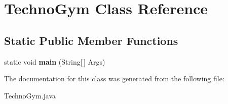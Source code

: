 \hypertarget{class_techno_gym}{}\section{Techno\+Gym Class Reference}
\label{class_techno_gym}
\subsection*{Static Public Member Functions}
\begin{DoxyCompactItemize}
\item 
\hypertarget{class_techno_gym_a69e68d6c95e9fa3806b94b6de51908c3}{}static void {\bfseries main} (String\mbox{[}$\,$\mbox{]} Args)\label{class_techno_gym_a69e68d6c95e9fa3806b94b6de51908c3}

\end{DoxyCompactItemize}


The documentation for this class was generated from the following file\+:\begin{DoxyCompactItemize}
\item 
Techno\+Gym.\+java\end{DoxyCompactItemize}
